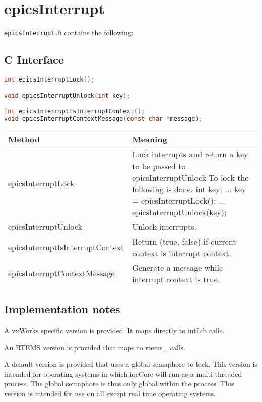 \section{epicsInterrupt}

\verb|epicsInterrupt.h| contains the following:

\subsection{C Interface}

\begin{lstlisting}[language=C]
int epicsInterruptLock();

void epicsInterruptUnlock(int key);

int epicsInterruptIsInterruptContext();
void epicsInterruptContextMessage(const char *message);
\end{lstlisting}

\begin{center}
\begin{longtable}{p{1.97222in}p{3.66667in}}
\textbf{Method} & \textbf{Meaning}\\
\hline
epicsInterruptLock & Lock interrupts and return a key to be passed to epicsInterruptUnlock To lock the following is done.       int key;      ...      key = epicsInterruptLock();       ...       epicsInterruptUnlock(key);\\
epicsInterruptUnlock & Unlock interrupts.\\
epicsInterruptIsInterruptContext & Return (true, false) if current context is interrupt context.\\
epicsInterruptContextMessage & Generate a message while interrupt context is true.
\end{longtable}

\end{center}


\subsection{Implementation notes}

A vxWorks specific version is provided. It maps directly to intLib calls.

An RTEMS version is provided that maps to rtems\_ calls.

A default version is provided that uses a global semaphore to lock. This version is intended for operating systems in 
which iocCore will run as a multi threaded process. The global semaphore is thus only global within the process. This 
version is intended for use on all except real time operating systems.

